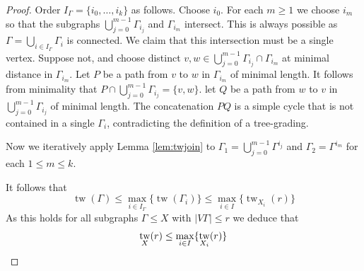 \documentclass{article}
\numberwithin{equation}{section}
\theoremstyle{definition}
\theoremstyle{citing}
\DeclareMathOperator{\tw}{tw}
\numberwithin{equation}{section}
\begin{document}
\begin{proof}
    Order $I_\Gamma=\{i_0,\ldots,i_k\}$ as follows. Choose $i_0$. For each $m\geq 1$ we choose $i_m$ so that the subgraphs $\bigcup_{j=0}^{m-1} \Gamma_{i_j}$ and $\Gamma_{i_m}$ intersect. This is always possible as $\Gamma=\bigcup_{i\in I_\Gamma} \Gamma_i$ is connected. We claim that this intersection must be a single vertex. Suppose not, and choose distinct $v,w\in \bigcup_{j=0}^{m-1} \Gamma_{i_j}\cap\Gamma_{i_m}$ at minimal distance in $\Gamma_{i_m}$. Let $P$ be a path from $v$ to $w$ in $\Gamma_{i_m}$ of minimal length. It follows from minimality that $P\cap \bigcup_{j=0}^{m-1} \Gamma_{i_j}=\{v,w\}$. let $Q$ be a path from $w$ to $v$ in $\bigcup_{j=0}^{m-1} \Gamma_{i_j}$ of minimal length. The concatenation $PQ$ is a simple cycle that is not contained in a single $\Gamma_i$, contradicting the definition of a tree-grading.
    
    Now we iteratively apply Lemma \ref{lem:twjoin} to $\Gamma_1=\bigcup_{j=0}^{m-1} \Gamma^{i_j}$ and $\Gamma_2=\Gamma^{i_{m}}$ for each $1\leq m\leq k$.

    It follows that
    \[
        \tw(\Gamma) \leq \max_{i\in I_\Gamma} \{\tw(\Gamma_i)\} \leq \max_{i\in I} \{\tw_{X_i}(r)\}
    \]
    As this holds for all subgraphs $\Gamma\leq X$ with $|V\Gamma|\leq r$ we deduce that
    \[
        \tw_X(r) \leq \max_{i\in I} \{\tw_{X_i}(r)\}  \qedhere
    \]
\end{proof}
\end{document}

